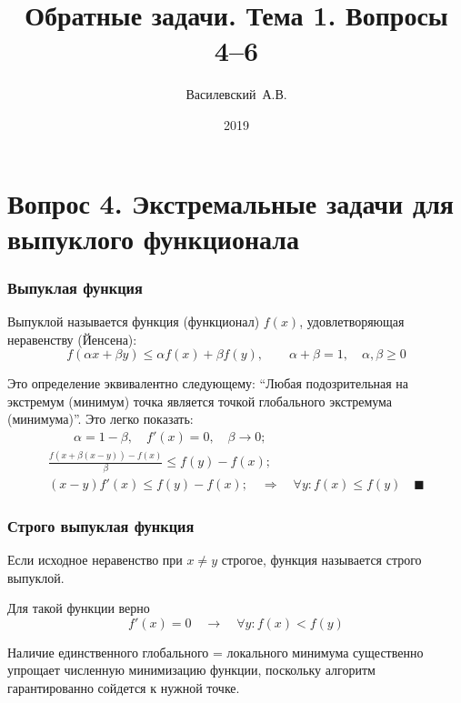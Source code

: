 \documentclass[compress]{beamer}
\title{Обратные задачи. Тема 1. Вопросы 4--6}
\author{Василевский~А.В.}
\institute[ННГУ]{Нижегородский университет им. Н.И.~Лобачевского}
\date{2019}
\begin{document}
    \frame[plain]{\titlepage}

    \section[Вопрос 4]{Вопрос 4. Экстремальные задачи для выпуклого функционала}

    \begin{frame}\frametitle{Выпуклая функция}

        Выпуклой называется функция (функционал) $f(x)$, удовлетворяющая неравенству (Йенсена):
        \begin{equation*}
            f(\alpha x + \beta y) \le \alpha f(x) + \beta f(y), \qquad \alpha + \beta = 1, \quad \alpha, \beta \ge 0
        \end{equation*}

        Это определение эквивалентно следующему: \enquote{Любая подозрительная на экстремум (минимум) точка является точкой глобального экстремума (минимума)}. Это легко показать:
        \begin{gather*}
            \qquad \alpha = 1 - \beta, \quad f'(x) = 0, \quad \beta \to 0; \\
            \frac{f(x + \beta(x - y)) - f(x)}{\beta} \le f(y) - f(x); \\
            (x - y) f'(x) \le f(y) - f(x); \quad\Longrightarrow\quad \forall y: f(x) \le f(y) \quad\blacksquare
        \end{gather*}

    \end{frame}

    \begin{frame}\frametitle{Строго выпуклая функция}

        Если исходное неравенство при $x \neq y$ строгое, функция называется строго выпуклой.

        Для такой функции верно
        \begin{equation*}
            f'(x) = 0 \quad\longrightarrow\quad \forall y: f(x) < f(y)
        \end{equation*}

        Наличие единственного глобального = локального минимума существенно упрощает численную минимизацию функции, поскольку алгоритм гарантированно сойдется к нужной точке.

    \end{frame}
\end{document}

